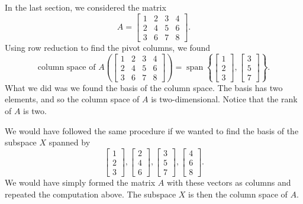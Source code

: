 \begin{example}
In the last section, we considered the matrix
\begin{equation*}
A =
\begin{bmatrix}
1 & 2 & 3 & 4 \\
2 & 4 & 5 & 6 \\
3 & 6 & 7 & 8
\end{bmatrix} .
\end{equation*}
Using row reduction to find the pivot columns, we found
\begin{equation*}
\text{column space of $A$} \left(
\begin{bmatrix}
1 & 2 & 3 & 4 \\
2 & 4 & 5 & 6 \\
3 & 6 & 7 & 8
\end{bmatrix} 
\right)
=
\operatorname{span}
\left\{
\begin{bmatrix}
1 \\
2 \\
3 
\end{bmatrix} 
,
\begin{bmatrix}
3 \\
5 \\
7 
\end{bmatrix} 
\right\} .
\end{equation*}
What we did was we found the basis of the column space.
The basis has two elements, and so the column space of $A$ is two-dimensional.
Notice that the rank of $A$ is two.
\end{example}

We would have followed the same procedure if we wanted to find the basis of
the subspace $X$ spanned by
\begin{equation*}
\begin{bmatrix}
1 \\
2 \\
3 
\end{bmatrix} 
,
\begin{bmatrix}
2 \\
4 \\
6 
\end{bmatrix} 
,
\begin{bmatrix}
3 \\
5 \\
7 
\end{bmatrix} 
,
\begin{bmatrix}
4 \\
6 \\
8 
\end{bmatrix}
.
\end{equation*}
We would have simply formed the matrix $A$ with these vectors as columns
and repeated the computation above.  The subspace $X$ is then the column space of
$A$.

